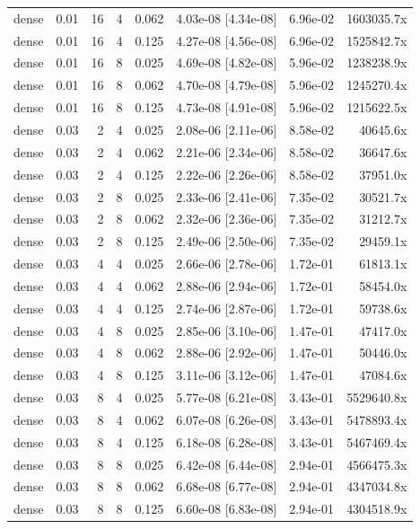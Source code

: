 \begin{tabular}{lrrrrrrr}
dense & 0.01 & 16 & 4 & 0.062 & 4.03e-08 [4.34e-08] & 6.96e-02 & 1603035.7x \\
dense & 0.01 & 16 & 4 & 0.125 & 4.27e-08 [4.56e-08] & 6.96e-02 & 1525842.7x \\
dense & 0.01 & 16 & 8 & 0.025 & 4.69e-08 [4.82e-08] & 5.96e-02 & 1238238.9x \\
dense & 0.01 & 16 & 8 & 0.062 & 4.70e-08 [4.79e-08] & 5.96e-02 & 1245270.4x \\
dense & 0.01 & 16 & 8 & 0.125 & 4.73e-08 [4.91e-08] & 5.96e-02 & 1215622.5x \\
dense & 0.03 & 2 & 4 & 0.025 & 2.08e-06 [2.11e-06] & 8.58e-02 & 40645.6x \\
dense & 0.03 & 2 & 4 & 0.062 & 2.21e-06 [2.34e-06] & 8.58e-02 & 36647.6x \\
dense & 0.03 & 2 & 4 & 0.125 & 2.22e-06 [2.26e-06] & 8.58e-02 & 37951.0x \\
dense & 0.03 & 2 & 8 & 0.025 & 2.33e-06 [2.41e-06] & 7.35e-02 & 30521.7x \\
dense & 0.03 & 2 & 8 & 0.062 & 2.32e-06 [2.36e-06] & 7.35e-02 & 31212.7x \\
dense & 0.03 & 2 & 8 & 0.125 & 2.49e-06 [2.50e-06] & 7.35e-02 & 29459.1x \\
dense & 0.03 & 4 & 4 & 0.025 & 2.66e-06 [2.78e-06] & 1.72e-01 & 61813.1x \\
dense & 0.03 & 4 & 4 & 0.062 & 2.88e-06 [2.94e-06] & 1.72e-01 & 58454.0x \\
dense & 0.03 & 4 & 4 & 0.125 & 2.74e-06 [2.87e-06] & 1.72e-01 & 59738.6x \\
dense & 0.03 & 4 & 8 & 0.025 & 2.85e-06 [3.10e-06] & 1.47e-01 & 47417.0x \\
dense & 0.03 & 4 & 8 & 0.062 & 2.88e-06 [2.92e-06] & 1.47e-01 & 50446.0x \\
dense & 0.03 & 4 & 8 & 0.125 & 3.11e-06 [3.12e-06] & 1.47e-01 & 47084.6x \\
dense & 0.03 & 8 & 4 & 0.025 & 5.77e-08 [6.21e-08] & 3.43e-01 & 5529640.8x \\
dense & 0.03 & 8 & 4 & 0.062 & 6.07e-08 [6.26e-08] & 3.43e-01 & 5478893.4x \\
dense & 0.03 & 8 & 4 & 0.125 & 6.18e-08 [6.28e-08] & 3.43e-01 & 5467469.4x \\
dense & 0.03 & 8 & 8 & 0.025 & 6.42e-08 [6.44e-08] & 2.94e-01 & 4566475.3x \\
dense & 0.03 & 8 & 8 & 0.062 & 6.68e-08 [6.77e-08] & 2.94e-01 & 4347034.8x \\
dense & 0.03 & 8 & 8 & 0.125 & 6.60e-08 [6.83e-08] & 2.94e-01 & 4304518.9x \\

\end{tabular}

